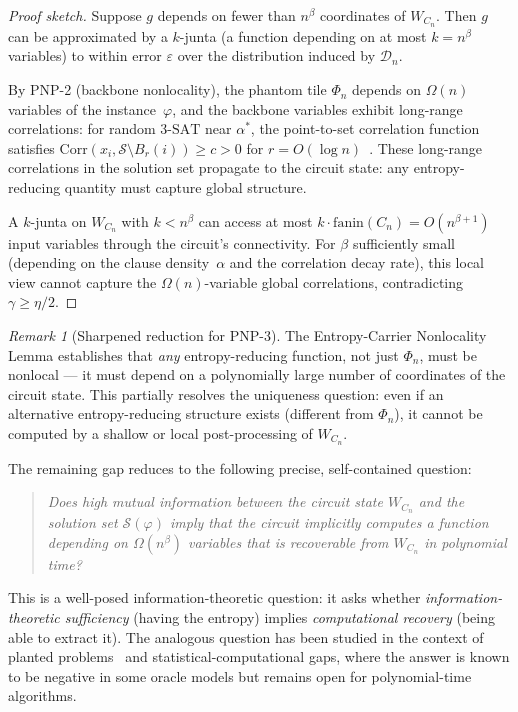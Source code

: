 \documentclass[11pt]{article}
\theoremstyle{definition}
\theoremstyle{remark}
\newtheorem{remark}[theorem]{Remark}
\newcommand{\calD}{\mathcal{D}}
\newcommand{\calS}{\mathcal{S}}
\newcommand{\threeSAT}{\mathrm{3\text{-}SAT}}
\begin{document}
\begin{proof}[Proof sketch]
Suppose $g$ depends on fewer than $n^\beta$ coordinates of $W_{C_n}$.
Then $g$ can be approximated by a $k$-junta (a function depending on
at most $k = n^\beta$ variables) to within error $\varepsilon$ over
the distribution induced by $\calD_n$.

By PNP-2 (backbone nonlocality), the phantom tile $\Phi_n$ depends on
$\Omega(n)$ variables of the instance~$\varphi$, and the backbone
variables exhibit long-range correlations: for random $\threeSAT$ near
$\alpha^*$, the point-to-set correlation function satisfies
$\mathrm{Corr}(x_i, \calS \setminus B_r(i)) \geq c > 0$ for
$r = O(\log n)$~\cite{MPZ}.  These long-range correlations in the
solution set propagate to the circuit state: any entropy-reducing
quantity must capture global structure.

A $k$-junta on $W_{C_n}$ with $k < n^\beta$ can access at most
$k \cdot \mathrm{fanin}(C_n) = O(n^{\beta + 1})$ input variables
through the circuit's connectivity.  For $\beta$ sufficiently small
(depending on the clause density~$\alpha$ and the correlation decay
rate), this local view cannot capture the $\Omega(n)$-variable
global correlations, contradicting $\gamma \geq \eta/2$.
\end{proof}

\begin{remark}[Sharpened reduction for PNP-3]
\label{rem:sharpened-PNP3}
The Entropy-Carrier Nonlocality Lemma establishes that \emph{any}
entropy-reducing function, not just $\Phi_n$, must be nonlocal --- it
must depend on a polynomially large number of coordinates of the circuit
state.  This partially resolves the uniqueness question: even if an
alternative entropy-reducing structure exists (different from $\Phi_n$),
it cannot be computed by a shallow or local post-processing of $W_{C_n}$.

The remaining gap reduces to the following precise, self-contained
question:
\begin{quote}
\emph{Does high mutual information between the circuit state $W_{C_n}$
and the solution set $\calS(\varphi)$ imply that the circuit
implicitly computes a function depending on $\Omega(n^\beta)$
variables that is recoverable from $W_{C_n}$ in polynomial time?}
\end{quote}
This is a well-posed information-theoretic question: it asks whether
\emph{information-theoretic sufficiency} (having the entropy) implies
\emph{computational recovery} (being able to extract it).
The analogous question has been studied in the context of planted
problems~\cite{planted} and statistical-computational gaps, where the
answer is known to be negative in some oracle models but remains open
for polynomial-time algorithms.
\end{remark}
\end{document}
